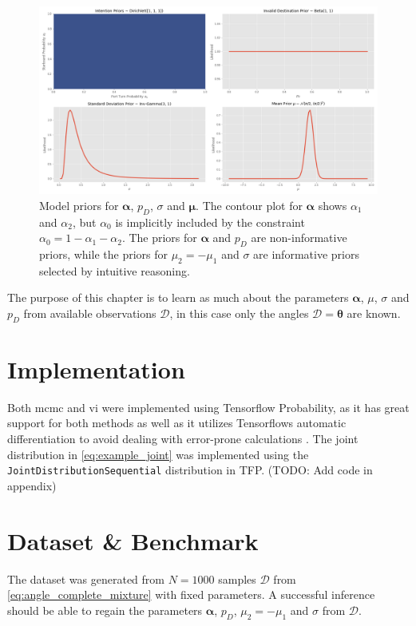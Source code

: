 \begin{figure}
    \centering
    \includegraphics[width=1\textwidth]{figures/priors.png}
    \caption{Model priors for $\boldsymbol{\alpha}$, $p_D$, $\sigma$ and $\boldsymbol{\mu}$. The contour plot for $\boldsymbol{\alpha}$ shows $\alpha_1$ and $\alpha_2$, but $\alpha_0$ is implicitly included by the constraint $\alpha_0 = 1 - \alpha_1 - \alpha_2$. The priors for $\boldsymbol{\alpha}$ and $p_D$ are non-informative priors, while the priors for $\mu_2 = -\mu_1$ and $\sigma$ are informative priors selected by intuitive reasoning.}
    \label{fig:priors}
\end{figure}

The purpose of this chapter is to learn as much about the parameters $\boldsymbol{\alpha}$, $\mu$, $\sigma$ and $p_D$ from available observations $\mathcal{D}$, in this case only the angles $\mathcal{D} = \boldsymbol{\theta}$ are known. 

\section{Implementation}
Both \acrshort{mcmc} and \acrshort{vi} were implemented using Tensorflow Probability, as it has great support for both methods as well as it utilizes Tensorflows automatic differentiation to avoid dealing with error-prone calculations \cite{tensorflow2015-whitepaper}. The joint distribution in \cref{eq:example_joint} was implemented using the \texttt{JointDistributionSequential} distribution in TFP. (TODO: Add code in appendix)


\section{Dataset \& Benchmark}
The dataset was generated from $N=1000$ samples $\boldsymbol{\mathcal{D}}$ from \cref{eq:angle_complete_mixture} with fixed parameters. A successful inference should be able to regain the parameters $\boldsymbol{\alpha}$, $p_D$, $\mu_2 = -\mu_1$ and $\sigma$ from $\mathcal{D}$.

